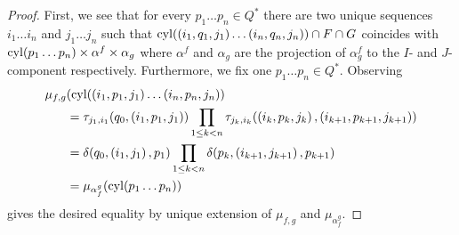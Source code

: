 \begin{proof}
  First, we see that for every $p_{1}\dots p_{n}\in Q^{*}$ there are two 
  unique sequences $i_{1}\dots i_{n}$ and $j_{1}\dots j_{n}$ such that
  $\operatorname{cyl}(\left(i_{1}, q_{1}, j_{1}\right)\dots\left(i_{n}, q_{n}, j_{n}\right))\cap 
  F\cap G$ coincides with 
  $\operatorname{cyl}(p_{1}\dots p_{n})\times \alpha^{f}\times\alpha_{g}$ where 
  $\alpha^{f}$ and $\alpha_{g}$ are the projection of $\alpha^{f}_{g}$ to the
  $I$- and $J$-component respectively. Furthermore, we fix one 
  $p_{1}\dots p_{n}\in Q^{*}$. Observing
  \begin{align*}
    \mu_{f, g}&(
      \operatorname{cyl}(\left(i_{1}, p_{1}, j_{1}\right)\dots\left(i_{n}, p_{n}, j_{n}\right))\\
    &= \tau_{j_{1}, i_{1}}(q_{0}, \left(i_{1}, p_{1}, j_{1}\right))
      \prod\limits_{1\leq k < n}\tau_{j_{k}, i_{k}}(\left(i_{k}, p_{k}, 
        j_{k}\right),\left(i_{k+1}, p_{k+1}, j_{k+1}\right))\\
    &= \delta(q_{0}, \left(i_{1}, j_{1}\right), p_{1})
      \prod\limits_{1\leq k < n}\delta(p_{k}, \left(i_{k+1}, j_{k+1}\right), 
        p_{k+1})\\
    &= \mu_{\alpha_{f}^{g}}(\operatorname{cyl}(p_{1}\dots p_{n}))
  \end{align*}
  gives the desired equality by unique extension of $\mu_{f, g}$ and 
  $\mu_{\alpha_{f}^{g}}$.
\end{proof}

